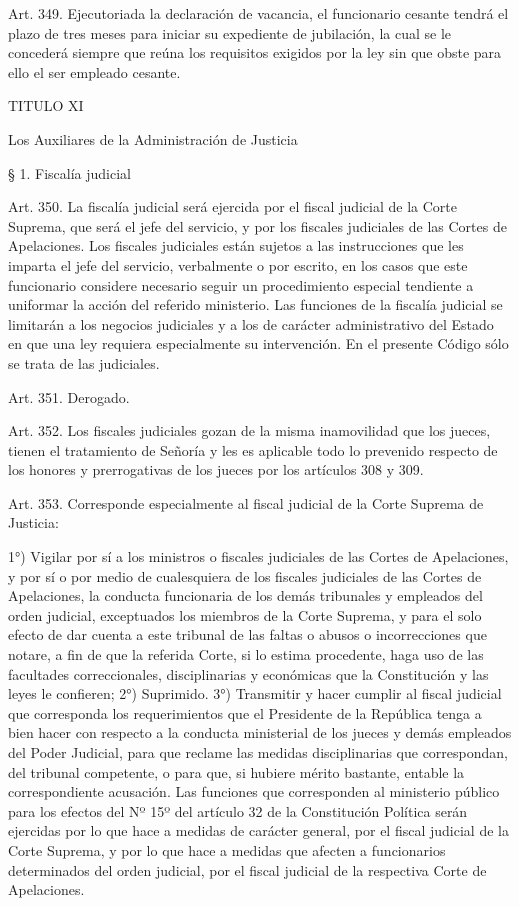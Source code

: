     Art. 349. Ejecutoriada la declaración de vacancia, el funcionario cesante tendrá el plazo de tres meses para iniciar su expediente de jubilación, la cual se le concederá siempre que reúna los requisitos exigidos por la ley sin que obste para ello el ser empleado cesante.

    TITULO XI

    Los Auxiliares de la Administración de Justicia


    § 1. Fiscalía judicial



    Art. 350. La fiscalía judicial será ejercida por el fiscal judicial de la Corte Suprema, que será el jefe del servicio, y por los fiscales judiciales de las Cortes de Apelaciones.
    Los fiscales judiciales están sujetos a las instrucciones que les imparta el jefe del servicio, verbalmente o por escrito, en los casos que este funcionario considere necesario seguir un procedimiento especial tendiente a uniformar la acción del referido ministerio.
    Las funciones de la fiscalía judicial se limitarán a los negocios judiciales y a los de carácter administrativo del Estado en que una ley requiera especialmente su intervención.
    En el presente Código sólo se trata de las judiciales.


    Art. 351. Derogado.



    Art. 352. Los fiscales judiciales gozan de la misma inamovilidad que los jueces, tienen el tratamiento de Señoría y les es aplicable todo lo prevenido respecto de los honores y prerrogativas de los jueces por los artículos 308 y 309.



    Art. 353. Corresponde especialmente al fiscal judicial de la Corte Suprema de Justicia:

    1°) Vigilar por sí a los ministros o fiscales judiciales de las Cortes de Apelaciones, y por sí o por medio de cualesquiera de los fiscales judiciales de las Cortes de Apelaciones, la conducta funcionaria de los demás tribunales y empleados del orden judicial, exceptuados los miembros de la Corte Suprema, y para el solo efecto de dar cuenta a este tribunal de las faltas o abusos o incorrecciones que notare, a fin de que la referida Corte, si lo estima procedente, haga uso de las facultades correccionales, disciplinarias y económicas que la Constitución y las leyes le confieren;
    2°) Suprimido.
    3°) Transmitir y hacer cumplir al fiscal judicial que corresponda los requerimientos que el Presidente de la República tenga a bien hacer con respecto a la conducta ministerial de los jueces y demás empleados del Poder Judicial, para que reclame las medidas disciplinarias que correspondan, del tribunal competente, o para que, si hubiere mérito bastante, entable la correspondiente acusación.
    Las funciones que corresponden al ministerio público para los efectos del Nº 15º del artículo 32 de la Constitución Política serán ejercidas por lo que hace a medidas de carácter general, por el fiscal judicial de la Corte Suprema, y por lo que hace a medidas que afecten a funcionarios determinados del orden judicial, por el fiscal judicial de la respectiva Corte de Apelaciones.


